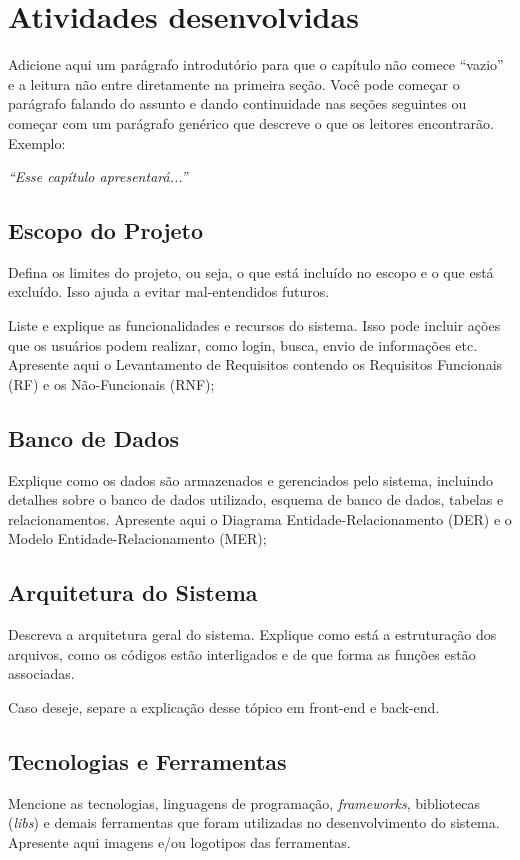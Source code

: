 \chapter{Atividades desenvolvidas}

Adicione aqui um parágrafo introdutório para que o capítulo não comece ``vazio'' e a leitura não entre diretamente na primeira seção. Você pode começar o parágrafo falando do assunto e dando continuidade nas seções seguintes ou começar com um parágrafo genérico que descreve o que os leitores encontrarão. Exemplo:

\textit{``Esse capítulo apresentará...''}

\section{Escopo do Projeto}
Defina os limites do projeto, ou seja, o que está incluído no escopo e o que está excluído. Isso ajuda a evitar mal-entendidos futuros.

Liste e explique as funcionalidades e recursos do sistema. Isso pode incluir ações que os usuários podem realizar, como login, busca, envio de informações etc. Apresente aqui o Levantamento de Requisitos contendo os Requisitos Funcionais (RF) e os Não-Funcionais (RNF);

\section{Banco de Dados}
Explique como os dados são armazenados e gerenciados pelo sistema, incluindo detalhes sobre o banco de dados utilizado, esquema de banco de dados, tabelas e relacionamentos. Apresente aqui o Diagrama Entidade-Relacionamento (DER) e o Modelo Entidade-Relacionamento (MER);

\section{Arquitetura do Sistema}
Descreva a arquitetura geral do sistema. Explique como está a estruturação dos arquivos, como os códigos estão interligados e de que forma as funções estão associadas.

Caso deseje, separe a explicação desse tópico em front-end e back-end.


\section{Tecnologias e Ferramentas}
Mencione as tecnologias, linguagens de programação, \textit{frameworks}, bibliotecas (\textit{libs}) e demais ferramentas que foram utilizadas no desenvolvimento do sistema. Apresente aqui imagens e/ou logotipos das ferramentas.
